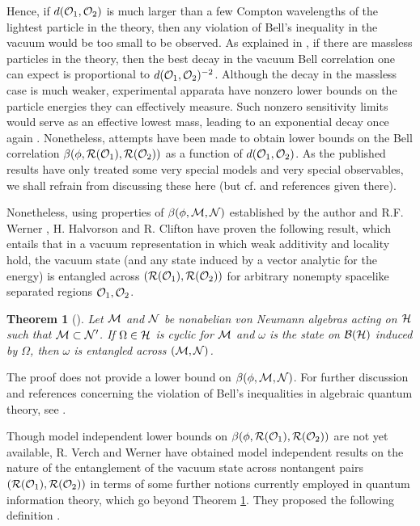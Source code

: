 \documentclass[12pt]{article}
\newtheorem{theorem}{Theorem}[section]
\def\Bs{{\cal B}}
\def\Hs{{\cal H}}
\def\Ms{{\cal M}}
\def\Ns{{\cal N}}
\def\Os{{\cal O}}
\def\Rs{{\cal R}}
\def\pairf{{(\Rs(\Os_1),\Rs(\Os_2))}}
\begin{document}
      Hence, if $d(\Os_1,\Os_2)$ is much larger than a few Compton
wavelengths of the lightest particle in the theory, then any violation
of Bell's inequality in the vacuum would be too small to be
observed. As explained in \cite{SW2}, if there are massless particles in
the theory, then the best decay in the vacuum Bell correlation one can
expect is proportional to $d(\Os_1,\Os_2)^{-2}$. Although the decay in
the massless case is much weaker, experimental apparata have nonzero
lower bounds on the particle energies they can effectively
measure. Such nonzero sensitivity limits would serve as an effective
lowest mass, leading to an exponential decay once again
\cite{SW2}. Nonetheless, attempts have been made to obtain lower
bounds on the Bell correlation $\beta(\phi,\Rs(\Os_1),\Rs(\Os_2))$ as
a function of $d(\Os_1,\Os_2)$. As the published results have only
treated some very special models and very special observables, we
shall refrain from discussing these here (but cf. \cite{ReReSi} and
references given there).

     Nonetheless, using properties of $\beta(\phi,\Ms,\Ns)$
established by the author and R.F. Werner \cite{SW6}, H. Halvorson
and R. Clifton have proven the following result, which entails that in
a vacuum representation in which weak additivity and locality hold,
the vacuum state (and any state induced by a vector analytic for the
energy) is entangled across $\pairf$ for arbitrary nonempty spacelike
separated regions $\Os_1,\Os_2$.

\begin{theorem} [\cite{HaCl1}]  \label{HC}
Let $\Ms$ and $\Ns$ be nonabelian von Neumann algebras acting on $\Hs$ 
such that $\Ms \subset \Ns'$. If $\Omega \in \Hs$ is cyclic for
$\Ms$ and $\omega$ is the state on $\Bs(\Hs)$ induced by $\Omega$,
then $\omega$ is entangled across $(\Ms,\Ns)$. 
\end{theorem}

     The proof does not provide a lower bound on
$\beta(\phi,\Ms,\Ns)$.  For further discussion and references
concerning the violation of Bell's inequalities in algebraic quantum
theory, see \cite{Su3,SW6,Red,HaCl1}.

     Though model independent lower bounds on
$\beta(\phi,\Rs(\Os_1),\Rs(\Os_2))$ are not yet available, R. Verch
and Werner \cite {VeWe} have obtained model independent results
on the nature of the entanglement of the vacuum state across
nontangent pairs $\pairf$ in terms of some further notions currently
employed in quantum information theory, which go beyond Theorem
\ref{HC}. They proposed the following definition \cite{VeWe}.
\end{document}
